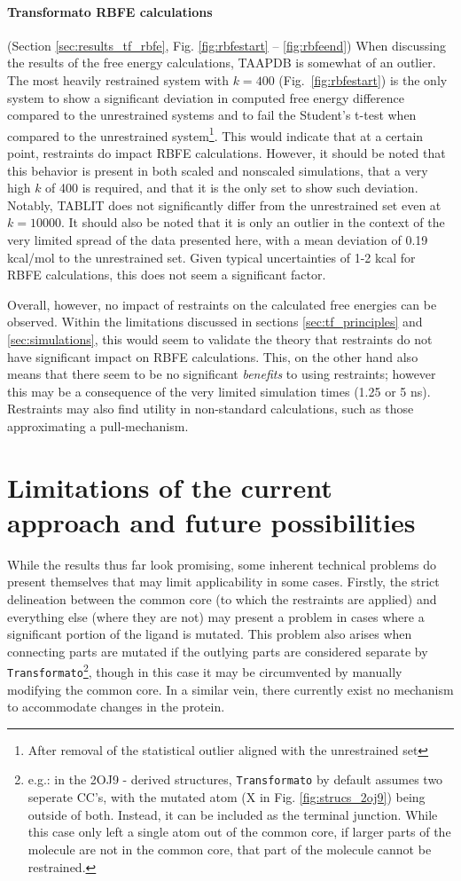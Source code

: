 \documentclass[oneside]{scrreprt}
\begin{document}
\paragraph{Transformato RBFE calculations} (Section \ref{sec:results_tf_rbfe}, Fig. \ref{fig:rbfestart} -- \ref{fig:rbfeend}) When discussing the results of the free energy calculations, TAAPDB is somewhat of an outlier. The most heavily restrained system with $k=400$ (Fig.~\ref{fig:rbfestart}) is the only system to show a significant deviation in computed free energy difference compared to the unrestrained systems and to fail the Student's t-test when compared to the unrestrained system\footnote{After removal of the statistical outlier aligned with the unrestrained set}. This would indicate that at a certain point, restraints do impact RBFE calculations. However, it should be noted that this behavior is present in both scaled and nonscaled simulations, that a very high $k$ of 400 is required, and that it is the only set to show such deviation. Notably, TABLIT does not significantly differ from the unrestrained set even at $k=10000$. It should also be noted that it is only an outlier in the context of the very limited spread of the data presented here, with a mean deviation of 0.19 kcal/mol to the unrestrained set. Given typical uncertainties of 1-2 kcal for RBFE calculations, this does not seem a significant factor.

Overall, however, no impact of restraints on the calculated free energies can be observed. Within the limitations discussed in sections \ref{sec:tf_principles} and \ref{sec:simulations}, this would seem to validate the theory that restraints do not have significant impact on RBFE calculations. This, on the other hand also means that there seem to be no significant \emph{benefits} to using restraints; however this may be a consequence of the very limited simulation times (1.25 or 5 ns). Restraints may also find utility in non-standard calculations, such as those approximating a pull-mechanism.

\section{Limitations of the current approach and future possibilities}
While the results thus far look promising, some inherent technical problems do present themselves that may limit applicability in some cases. Firstly, the strict delineation between the common core (to which the restraints are applied) and everything else (where they are not) may present a problem in cases where a significant portion of the ligand is mutated. This problem also arises when connecting parts are mutated if the outlying parts are considered separate by \texttt{Transformato}\footnote{e.g.: in the 2OJ9 - derived structures, \texttt{Transformato} by default assumes two seperate CC's, with the mutated atom (X in Fig. \ref{fig:strucs_2oj9}) being outside of both. Instead, it can be included as the terminal junction. While this case only left a single atom out of the common core, if larger parts of the molecule are not in the common core, that part of the molecule cannot be restrained.}, though in this case it may be circumvented by manually modifying the common core. In a similar vein, there currently exist no mechanism to accommodate changes in the protein.
\end{document}

